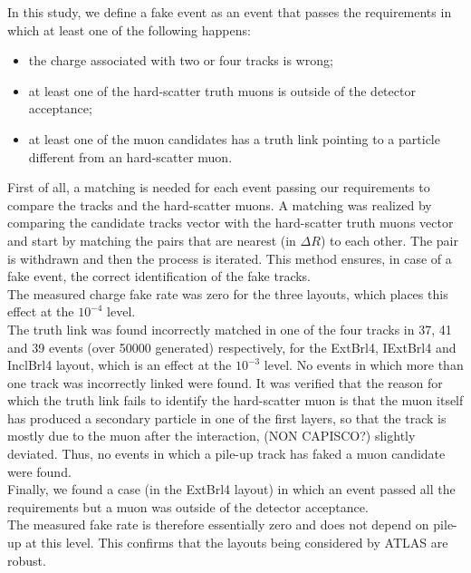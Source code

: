 \documentclass[a4paper,twoside,12pt]{article}
\begin{document}
In this study, we define a fake event as an event that passes the requirements in which at least one of 
the following happens:\\
\begin{itemize}
\item the charge associated with two or four tracks is wrong;
\item at least one of the hard-scatter truth muons is outside of the detector acceptance;
\item at least one of the muon candidates has a truth link pointing to a particle different
from an hard-scatter muon.
\end{itemize}

First of all, a matching is needed for each event passing our requirements to compare 
the tracks and the hard-scatter muons. A matching was realized by comparing the candidate
tracks vector with the hard-scatter truth muons vector and start by matching the pairs
that are nearest (in $\Delta R$) to each other. The pair is withdrawn and then the process
is iterated. This method ensures, in case of a fake event, the correct
identification of the fake tracks. \\

The measured charge fake rate was zero for the three layouts, which places this
effect at the $10^{-4}$ level. \\

The truth link was found incorrectly matched in one of the
four tracks in 37, 41 and 39 events (over 50000 generated) respectively, for the ExtBrl4, IExtBrl4
and InclBrl4 layout, which is an effect at the $10^{-3}$ level. No events in which more than one
track was incorrectly linked were found.  It was verified that the reason for which 
the truth link fails to identify the hard-scatter muon is that the muon itself has produced
a secondary particle in one of the first layers, so that the track is mostly due to the muon
after the interaction, (NON CAPISCO?) slightly deviated. Thus, no events in which a pile-up 
track has faked a muon candidate were found.\\

Finally, we found a case (in the ExtBrl4 layout) 
in which an event passed all the requirements but a muon was outside of the detector acceptance.\\

The measured fake rate is therefore essentially zero and does not depend on pile-up at this level.
This confirms that the layouts being considered by ATLAS are robust.
\end{document}
